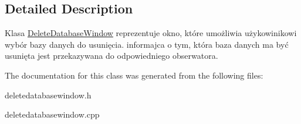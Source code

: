 \subsection{Detailed Description}
Klasa \mbox{\hyperlink{class_delete_database_window}{Delete\+Database\+Window}} reprezentuje okno, które umożliwia użykowinikowi wybór bazy danych do usunięcia. informajca o tym, która baza danych ma być usunięta jest przekazywana do odpowiedniego obserwatora. 

The documentation for this class was generated from the following files\+:\begin{DoxyCompactItemize}
\item 
deletedatabasewindow.\+h\item 
deletedatabasewindow.\+cpp\end{DoxyCompactItemize}
